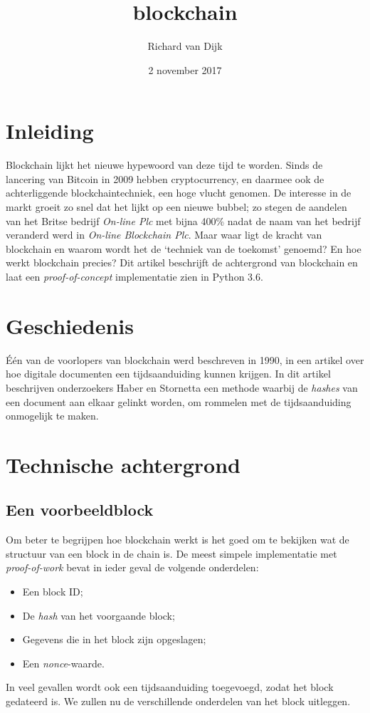 \documentclass{article}
\title{blockchain}
\date{2 november 2017}
\author{Richard van Dijk}
\begin{document}
\maketitle
\newpage
\tableofcontents
\newpage
{}
\setcounter{page}{1}

\section{Inleiding}
Blockchain lijkt het nieuwe hypewoord van deze tijd te worden. Sinds de lancering van Bitcoin in 2009 hebben cryptocurrency, en daarmee ook de achterliggende blockchaintechniek, een hoge vlucht genomen. De interesse in de markt groeit zo snel dat het lijkt op een nieuwe bubbel; zo stegen de aandelen van het Britse bedrijf \textit{On-line Plc} met bijna 400\% nadat de naam van het bedrijf veranderd werd in \textit{On-line Blockchain Plc}. Maar waar ligt de kracht van blockchain en waarom wordt het de `techniek van de toekomst' genoemd? En hoe werkt blockchain precies? Dit artikel beschrijft de achtergrond van blockchain en laat een \textit{proof-of-concept} implementatie zien in Python 3.6.

\section{Geschiedenis}
Één van de voorlopers van blockchain werd beschreven in 1990, in een artikel over hoe digitale documenten een tijdsaanduiding kunnen krijgen. In dit artikel beschrijven onderzoekers Haber en Stornetta een methode waarbij de \textit{hashes} van een document aan elkaar gelinkt worden, om rommelen met de tijdsaanduiding onmogelijk te maken.

\section{Technische achtergrond}
\subsection{Een voorbeeldblock}
Om beter te begrijpen hoe blockchain werkt is het goed om te bekijken wat de structuur van een block in de chain is. De meest simpele implementatie met \textit{proof-of-work} bevat in ieder geval de volgende onderdelen:
\begin{itemize}
\item Een block ID;
\item De \textit{hash} van het voorgaande block;
\item Gegevens die in het block zijn opgeslagen;
\item Een \textit{nonce}-waarde.
\end{itemize}
In veel gevallen wordt ook een tijdsaanduiding toegevoegd, zodat het block gedateerd is. We zullen nu de verschillende onderdelen van het block uitleggen.
\end{document}
